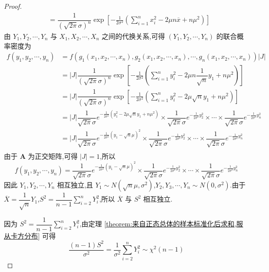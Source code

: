 \begin{proof}
$$\begin{aligned}
        &= \dfrac{1}{(\sqrt{2 \pi} \sigma)^n} \exp{ \left[-\frac{1}{2 \sigma^2} \left( \sum_{i=1}^{n} x_i^2 - 2 \mu n \overline{x} + n \mu^2 \right) \right] }
    \end{aligned}
    $$
    由 $Y_1, Y_2, \cdots, Y_n$ 与 $X_1,X_2,\cdots,X_n$ 之间的代换关系,可得 $(Y_1, Y_2, \cdots, Y_n)$ 的联合概率密度为
    $$
    \begin{aligned}
        f(y_1, y_2, \cdots, y_n) &= f(g_1(x_1, x_2, \cdots, x_n), g_2(x_1, x_2, \cdots, x_n), \cdots, g_n(x_1, x_2, \cdots, x_n)) |J| \\
        &= |J| \dfrac{1}{(\sqrt{2 \pi} \sigma)^n} \exp{ \left[-\frac{1}{2 \sigma^2} \left( \sum_{i=1}^{n} y_i^2 - 2 \mu n \dfrac{1}{\sqrt{n}} y_1 + n \mu^2 \right) \right] } \\
        &= |J| \dfrac{1}{(\sqrt{2 \pi} \sigma)^n} \exp{ \left[-\frac{1}{2 \sigma^2} \left( \sum_{i=1}^{n} y_i^2 - 2 \mu \sqrt{n} y_1 + n \mu^2 \right) \right] } \\
        &= |J| \dfrac{1}{\sqrt{2 \pi} \sigma} e^{-\frac{1}{2 \sigma^2} (y_1^2 - 2 \mu \sqrt{n} y_1 + n \mu^2)} \times \dfrac{1}{\sqrt{2 \pi} \sigma} e^{-\frac{1}{2 \sigma^2} y_2^2} \times \cdots \times \dfrac{1}{\sqrt{2 \pi} \sigma} e^{-\frac{1}{2 \sigma^2} y_n^2} \\
        &= |J| \dfrac{1}{\sqrt{2 \pi} \sigma} e^{-\frac{1}{2 \sigma^2} (y_1 - \sqrt{n} \mu)^2} \times \dfrac{1}{\sqrt{2 \pi} \sigma} e^{-\frac{1}{2 \sigma^2} y_2^2} \times \cdots \times \dfrac{1}{\sqrt{2 \pi} \sigma} e^{-\frac{1}{2 \sigma^2} y_n^2} \\
    \end{aligned}
    $$
    由于 $\boldsymbol{A}$ 为正交矩阵,可得 $|J|=1$,所以
    $$
    f(y_1, y_2, \cdots, y_n) = \dfrac{1}{\sqrt{2 \pi} \sigma} e^{-\frac{1}{2 \sigma^2} (y_1 - \sqrt{n} \mu)^2} \times \dfrac{1}{\sqrt{2 \pi} \sigma} e^{-\frac{1}{2 \sigma^2} y_2^2} \times \cdots \times \dfrac{1}{\sqrt{2 \pi} \sigma} e^{-\frac{1}{2 \sigma^2} y_n^2}
    $$
    因此 $Y_1, Y_2, \cdots, Y_n$ 相互独立,且 $Y_1 \sim N(\sqrt{n} \mu, \sigma^2)$,$Y_2, Y_3, \cdots, Y_n \sim N(0, \sigma^2)$.由于 $\overline{X} = \dfrac{1}{\sqrt{n}} Y_1$,$S^2 = \dfrac{1}{n-1} \displaystyle\sum_{i=2}^n Y_i^2$,所以 $\overline{X}$ 与 $S^2$ 相互独立.

    因为 $S^2 = \dfrac{1}{n-1} \displaystyle\sum_{i=2}^n Y_i^2$,由定理 \ref{theorem:来自正态总体的样本标准化后求和,服从卡方分布} 可得
    $$
    \dfrac{(n-1) S^2}{\sigma^2} = \dfrac{1}{\sigma^2} \sum_{i=2}^n Y_i^2 \sim \chi^2(n-1)
    $$
\end{proof}

